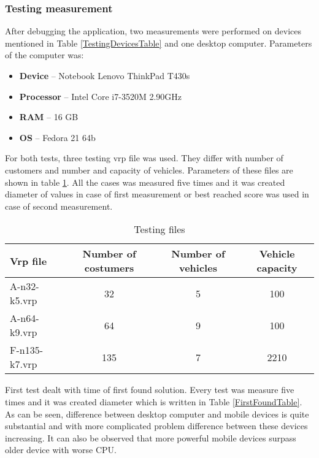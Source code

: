 \subsubsection{Testing measurement}
After debugging the application, two measurements were performed on devices mentioned in Table \ref{TestingDevicesTable}
and one desktop computer. Parameters of the computer was:

\begin{itemize}
\item \textbf{Device} -- Notebook Lenovo ThinkPad T430s
\item \textbf{Processor} -- Intel Core i7-3520M 2.90GHz
\item \textbf{RAM} -- 16 GB
\item \textbf{OS} -- Fedora 21 64b
\end{itemize}

For both tests, three testing vrp file was used. They differ with number of customers and number and capacity of
vehicles. Parameters of these files are shown in table \ref{TestingFilesTable}. All the cases was measured five times
and it was created diameter of values in case of first measurement or best reached score was used in case of second
measurement.

\begin {table}[h!]
    \begin{tabular}{|l|c|c|c|}
        \hline
        \textbf{Vrp file} & \textbf{Number of costumers} & \textbf{Number of vehicles} & \textbf{Vehicle capacity} \\ \hline \hline
        A-n32-k5.vrp      & 32   & 5 & 100   \\ \hline
        A-n64-k9.vrp      & 64   & 9 & 100   \\ \hline
        F-n135-k7.vrp     & 135  & 7 & 2210  \\ \hline
    \end{tabular}
    \centering
    \caption{Testing files}
    \label{TestingFilesTable}
\end{table}

First test dealt with time of first found solution. Every test was measure five times and it was created diameter which
is written in Table \ref{FirstFoundTable}. As can be seen, difference between desktop computer and mobile devices is
quite substantial and with more complicated problem difference between these devices increasing. It can also be observed
that more powerful mobile devices surpass older device with worse CPU.


